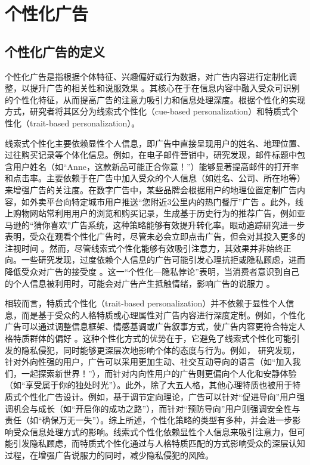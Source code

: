 \section{个性化广告}
\subsection{个性化广告的定义}
个性化广告是指根据个体特征、兴趣偏好或行为数据，对广告内容进行定制化调整，以提升广告的相关性和说服效果 \citep{dijkstra2012personalization}。其核心在于在信息内容中融入受众可识别的个性化特征，从而提高广告的注意力吸引力和信息处理深度。根据个性化的实现方式，研究者将其区分为线索式个性化（cue-based personalization）和特质式个性化（trait-based personalization）\citep{winter2021effects}。

线索式个性化主要依赖显性个人信息，即广告中直接呈现用户的姓名、地理位置、过往购买记录等个体化信息。例如，在电子邮件营销中\citep{maslowska2016all}，研究发现，邮件标题中包含用户姓名（如“Anne，这款新品可能正合你意！”）能够显著提高邮件的打开率和点击率。主要依赖于在广告中加入受众的个人信息（如姓名、公司、所在地等）来增强广告的关注度。在数字广告中，某些品牌会根据用户的地理位置定制广告内容，如外卖平台向特定城市用户推送“您附近3公里内的热门餐厅”广告 \citep{lambrecht2013does}。此外，线上购物网站常利用用户的浏览和购买记录，生成基于历史行为的推荐广告，例如亚马逊的“猜你喜欢”广告系统，这种策略能够有效提升转化率。眼动追踪研究进一步表明，受众在观看个性化广告时，尽管未必会立即点击广告，但会对其投入更多的注视时间 \citep{pfiffelmann2020personalized}。然而，尽管线索式个性化能够有效吸引注意力，其效果并非始终正向。一些研究发现，过度依赖个人信息的广告可能引发心理抗拒或隐私顾虑，进而降低受众对广告的接受度 \citep{chen2019understanding}。这一“个性化—隐私悖论”表明，当消费者意识到自己的个人信息被利用时，可能会对广告产生抵触情绪，影响广告的说服力 \citep{awad2006personalization}。

相较而言，特质式个性化（trait-based personalization）并不依赖于显性个人信息，而是基于受众的人格特质或心理属性对广告内容进行深度定制。例如，个性化广告可以通过调整信息框架、情感基调或广告叙事方式，使广告内容更符合特定人格特质群体的偏好 \citep{matz2017psychological,hirsh2012personalized}。这种个性化方式的优势在于，它避免了线索式个性化可能引发的隐私侵犯，同时能够更深层次地影响个体的态度与行为。例如，\citet{matz2017psychological} 研究发现，针对外向性强的用户，广告可以采用更加生动、社交互动导向的语言（如“加入我们，一起探索新世界！”），而针对内向性用户的广告则更偏向个人化和安静体验（如“享受属于你的独处时光”）。此外，除了大五人格，其他心理特质也被用于特质式个性化广告设计。例如，基于调节定向理论，广告可以针对“促进导向”用户强调机会与成长（如“开启你的成功之路”），而针对“预防导向”用户则强调安全性与责任（如“确保万无一失”）\citep{cesario2008regulatory}。综上所述，个性化策略的类型有多种，并会进一步影响受众信息处理方式的影响。线索式个性化依赖显性个人信息来吸引注意力，但可能引发隐私顾虑，而特质式个性化通过与人格特质匹配的方式影响受众的深层认知过程，在增强广告说服力的同时，减少隐私侵犯的风险。

